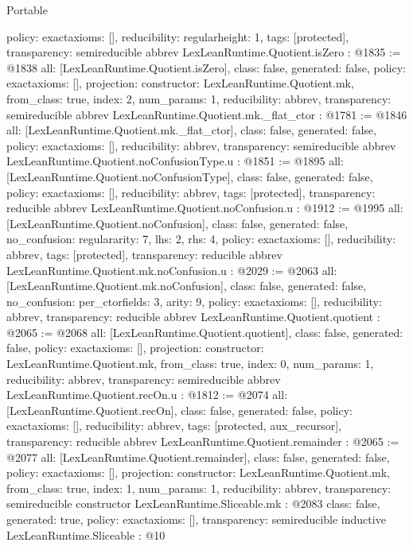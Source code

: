 \begin{lexlean}{Portable}
\begin{coremodule}
{  policy: exact{axioms: []},
  reducibility: regular{height: 1},
  tags: [protected],
  transparency: semireducible
}
abbrev LexLeanRuntime.Quotient.isZero : @1835 := @1838 {
  all: [LexLeanRuntime.Quotient.isZero],
  class: false,
  generated: false,
  policy: exact{axioms: []},
  projection: {constructor: LexLeanRuntime.Quotient.mk, from_class: true, index: 2, num_params: 1},
  reducibility: abbrev{},
  transparency: semireducible
}
abbrev LexLeanRuntime.Quotient.mk._flat_ctor : @1781 := @1846 {
  all: [LexLeanRuntime.Quotient.mk._flat_ctor],
  class: false,
  generated: false,
  policy: exact{axioms: []},
  reducibility: abbrev{},
  transparency: semireducible
}
abbrev LexLeanRuntime.Quotient.noConfusionType.{u} : @1851 := @1895 {
  all: [LexLeanRuntime.Quotient.noConfusionType],
  class: false,
  generated: false,
  policy: exact{axioms: []},
  reducibility: abbrev{},
  tags: [protected],
  transparency: reducible
}
abbrev LexLeanRuntime.Quotient.noConfusion.{u} : @1912 := @1995 {
  all: [LexLeanRuntime.Quotient.noConfusion],
  class: false,
  generated: false,
  no_confusion: regular{arity: 7, lhs: 2, rhs: 4},
  policy: exact{axioms: []},
  reducibility: abbrev{},
  tags: [protected],
  transparency: reducible
}
abbrev LexLeanRuntime.Quotient.mk.noConfusion.{u} : @2029 := @2063 {
  all: [LexLeanRuntime.Quotient.mk.noConfusion],
  class: false,
  generated: false,
  no_confusion: per_ctor{fields: 3, arity: 9},
  policy: exact{axioms: []},
  reducibility: abbrev{},
  transparency: reducible
}
abbrev LexLeanRuntime.Quotient.quotient : @2065 := @2068 {
  all: [LexLeanRuntime.Quotient.quotient],
  class: false,
  generated: false,
  policy: exact{axioms: []},
  projection: {constructor: LexLeanRuntime.Quotient.mk, from_class: true, index: 0, num_params: 1},
  reducibility: abbrev{},
  transparency: semireducible
}
abbrev LexLeanRuntime.Quotient.recOn.{u} : @1812 := @2074 {
  all: [LexLeanRuntime.Quotient.recOn],
  class: false,
  generated: false,
  policy: exact{axioms: []},
  reducibility: abbrev{},
  tags: [protected, aux_recursor],
  transparency: reducible
}
abbrev LexLeanRuntime.Quotient.remainder : @2065 := @2077 {
  all: [LexLeanRuntime.Quotient.remainder],
  class: false,
  generated: false,
  policy: exact{axioms: []},
  projection: {constructor: LexLeanRuntime.Quotient.mk, from_class: true, index: 1, num_params: 1},
  reducibility: abbrev{},
  transparency: semireducible
}
constructor LexLeanRuntime.Sliceable.mk : @2083 {
  class: false,
  generated: true,
  policy: exact{axioms: []},
  transparency: semireducible
}
inductive LexLeanRuntime.Sliceable : @10 {
}
\end{coremodule}
\end{lexlean}
